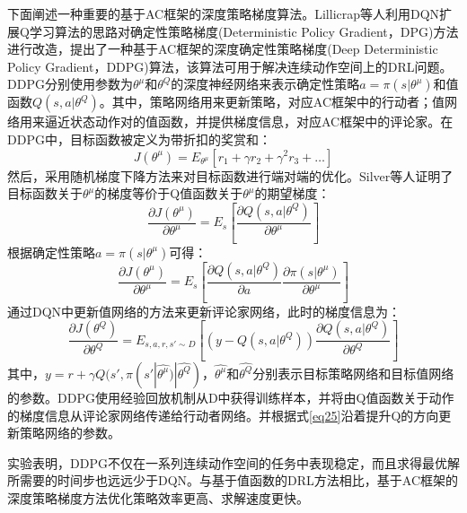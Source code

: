 \documentclass[bachelor]{thesis-uestc}
\begin{document}
	下面阐述一种重要的基于AC框架的深度策略梯度算法。Lillicrap等人利用DQN扩展Q学习算法的思路对确定性策略梯度(Deterministic Policy Gradient，DPG)方法进行改造，提出了一种基于AC框架的深度确定性策略梯度(Deep Deterministic Policy Gradient，DDPG)算法，该算法可用于解决连续动作空间上的DRL问题。DDPG分别使用参数为$\theta^\mu$和$\theta^Q$的深度神经网络来表示确定性策略$a=\pi(s|\theta^\mu)$和值函数$Q(s,a|\theta^Q)$。其中，策略网络用来更新策略，对应AC框架中的行动者；值网络用来逼近状态动作对的值函数，并提供梯度信息，对应AC框架中的评论家。在DDPG中，目标函数被定义为带折扣的奖赏和：
	\begin{equation}
		\label{eq23}
		J(\theta^\mu)=E_{\theta^\mu}[r_1+\gamma r_2+\gamma^2r_3+\dots]
	\end{equation}
	然后，采用随机梯度下降方法来对目标函数进行端对端的优化。Silver等人证明了目标函数关于$\theta^\mu$的梯度等价于Q值函数关于$\theta^\mu$的期望梯度：
	\begin{equation}
		\label{eq24}
		\frac{\partial J(\theta^\mu)}{\partial \theta^\mu}=E_s[\frac{\partial Q(s,a|\theta^Q)}{\partial \theta^\mu}]
	\end{equation}
	根据确定性策略$a=\pi(s|\theta^\mu)$可得：
	\begin{equation}
		\label{eq25}
		\frac{\partial J(\theta^\mu)}{\partial \theta^\mu}=E_s[\frac{\partial Q(s,a|\theta^Q)}{\partial a}\frac{\partial \pi(s|\theta^\mu)}{\partial \theta^\mu}]
	\end{equation}
	通过DQN中更新值网络的方法来更新评论家网络，此时的梯度信息为：
	\begin{equation}
		\label{eq26}
		\frac{\partial J(\theta^Q)}{\partial \theta^Q}=E_{s,a,r,s'\sim D}[(y-Q(s,a|\theta^Q))\frac{\partial Q(s,a|\theta^Q)}{\partial \theta^Q}]
	\end{equation}
	其中，$y=r+\gamma Q(s',\pi(s'|\hat{\theta ^\mu})|\hat{\theta ^Q})$，$\hat{\theta ^\mu}$和$\hat{\theta ^Q}$分别表示目标策略网络和目标值网络的参数。DDPG使用经验回放机制从D中获得训练样本，并将由Q值函数关于动作的梯度信息从评论家网络传递给行动者网络。并根据式\ref{eq25}沿着提升Q的方向更新策略网络的参数。
	
	实验表明，DDPG不仅在一系列连续动作空间的任务中表现稳定，而且求得最优解所需要的时间步也远远少于DQN。与基于值函数的DRL方法相比，基于AC框架的深度策略梯度方法优化策略效率更高、求解速度更快。
	
\end{document}
